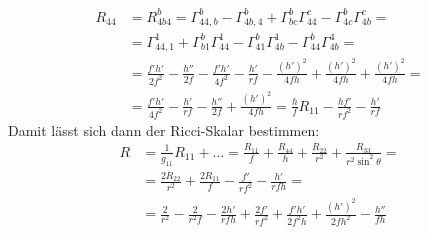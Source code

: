 \documentclass[a4paper,12pt]{article}
\begin{document}
\begin{align*}
R_{44}&=R^b_{4b4}=\Gamma^b_{44,b}-\Gamma^b_{4b,4}+\Gamma^b_{bc}\Gamma^c_{44}-\Gamma^b_{4c}\Gamma^c_{4b}=\\
&=\Gamma^1_{44,1}+\Gamma^b_{b1}\Gamma^1_{44}-\Gamma^b_{41}\Gamma^1_{4b}-\Gamma^b_{44}\Gamma^4_{4b}=\\
&=\frac{f'h'}{2f^2}-\frac{h''}{2f}-\frac{f'h'}{4f^2}-\frac{h'}{rf}-\frac{(h')^2}{4fh}+\frac{(h')^2}{4fh}+\frac{(h')^2}{4fh}=\\
&=\frac{f'h'}{4f^2}-\frac{h'}{rf}-\frac{h''}{2f}+\frac{(h')^2}{4fh}=\frac{h}{f}R_{11}-\frac{hf'}{rf^2}-\frac{h'}{rf}
\end{align*}
Damit lässt sich dann der Ricci-Skalar bestimmen:
\begin{align*}
R&=\frac{1}{g_{11}}R_{11}+\dots=\frac{R_{11}}{f}+\frac{R_{44}}{h}+\frac{R_{22}}{r^2}+\frac{R_{33}}{r^2\sin^2\theta}=\\
&=\frac{2R_{22}}{r^2}+\frac{2R_{11}}{f}-\frac{f'}{rf^2}-\frac{h'}{rfh}=\\
&=\frac{2}{r^2}-\frac{2}{r^2f}-\frac{2h'}{rfh}+\frac{2f'}{rf^2}+\frac{f'h'}{2f^2h}+\frac{(h')^2}{2fh^2}-\frac{h''}{fh}
\end{align*}\newpage
\end{document}
